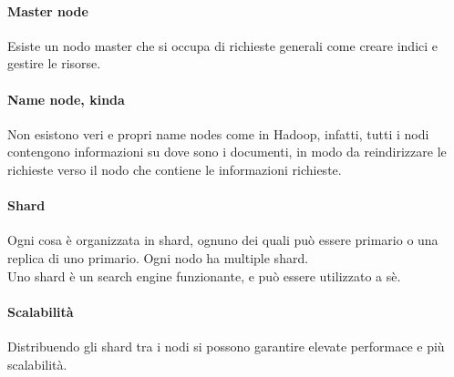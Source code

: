 \paragraph{Master node}
Esiste un nodo master che si occupa di richieste 
generali come creare indici e gestire le risorse.

\paragraph{Name node, kinda}
Non esistono veri e propri name nodes come in Hadoop, infatti, tutti i nodi contengono
informazioni su dove sono i documenti, in modo da reindirizzare le richieste verso 
il nodo che contiene le informazioni richieste.

\paragraph{Shard}
Ogni cosa è organizzata in shard, ognuno dei quali 
può essere primario o una replica di uno primario.
Ogni nodo ha multiple shard.\\
Uno shard è un search engine funzionante, e può essere utilizzato a sè.

\paragraph{Scalabilità}
Distribuendo gli shard tra i nodi si possono garantire elevate performace
e più scalabilità.